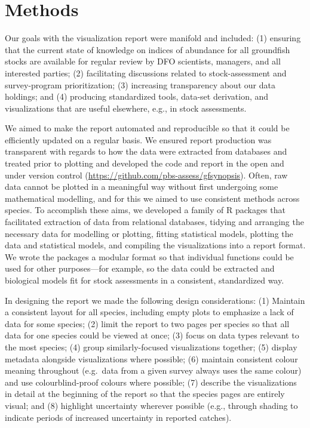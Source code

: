 \documentclass[12pt,]{article}
\begin{document}
\hypertarget{methods}{%
\section*{Methods}\label{methods}}

Our goals with the visualization report were manifold and included:
(1) ensuring that the current state of knowledge on indices of abundance for all groundfish stocks are available for regular review by DFO scientists, managers, and all interested parties;
(2) facilitating discussions related to stock-assessment and survey-program prioritization;
(3) increasing transparency about our data holdings; and
(4) producing standardized tools, data-set derivation, and visualizations that are useful elsewhere, e.g., in stock assessments.

We aimed to make the report automated and reproducible so that it could be efficiently updated on a regular basis. We ensured report production was transparent with regards to how the data were extracted from databases and treated prior to plotting and developed the code and report in the open and under version control (\url{https://github.com/pbs-assess/gfsynopsis}). Often, raw data cannot be plotted in a meaningful way without first undergoing some mathematical modelling, and for this we aimed to use consistent methods across species. To accomplish these aims, we developed a family of R packages that facilitated extraction of data from relational databases, tidying and arranging the necessary data for modelling or plotting, fitting statistical models, plotting the data and statistical models, and compiling the visualizations into a report format. We wrote the packages a modular format so that individual functions could be used for other purposes---for example, so the data could be extracted and biological models fit for stock assessments in a consistent, standardized way.

In designing the report we made the following design considerations:
(1) Maintain a consistent layout for all species, including empty plots to emphasize a lack of data for some species;
(2) limit the report to two pages per species so that all data for one species could be viewed at once;
(3) focus on data types relevant to the most species;
(4) group similarly-focused visualizations together;
(5) display metadata alongside visualizations where possible;
(6) maintain consistent colour meaning throughout (e.g.~data from a given survey always uses the same colour) and use colourblind-proof colours where possible;
(7) describe the visualizations in detail at the beginning of the report so that the species pages are entirely visual; and
(8) highlight uncertainty wherever possible (e.g., through shading to indicate periods of increased uncertainty in reported catches).
\end{document}
